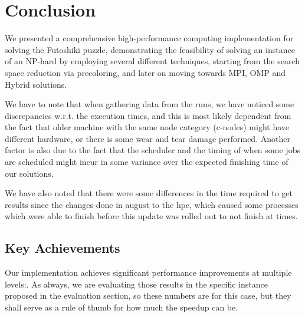 \section{Conclusion}
\label{sec:conclusion}
We presented a comprehensive high-performance computing implementation for solving the Futoshiki puzzle, demonstrating the feasibility of solving an instance of an NP-hard by employing several different techniques, starting from the search space reduction via precoloring, and later on moving towards MPI, OMP and Hybrid solutions.


We have to note that when gathering data from the runs, we have noticed some discrepancies w.r.t. the execution times, and this is most likely dependent from the fact that older machine with the same node category (c-nodes) might have different hardware, or there is some wear and tear damage performed. Another factor is also due to the fact that the scheduler and the timing of when some jobs are scheduled might incur in some variance over the expected finishing time of our solutions. 

We have also noted that there were some differences in the time required to get results since the changes done in august to the hpc, which caused some processes which were able to finish before this update was rolled out to not finish at times.

\subsection{Key Achievements}
Our implementation achieves significant performance improvements at multiple levels:. As always, we are evaluating those results in the specific instance proposed in the evaluation section, so these numbers are for this case, but they shall serve as a rule of thumb for how much the speedup can be.


